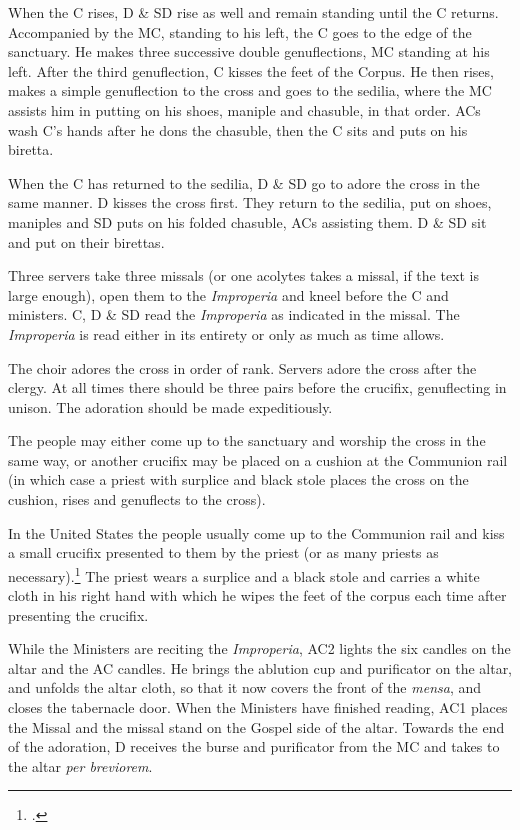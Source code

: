 {    \rubric When the C rises, D \& SD rise as well and remain standing until
    the C returns. Accompanied by the MC, standing to his left, the C goes to
    the edge of the sanctuary. He makes three successive double genuflections,
    MC standing at his left. After the third genuflection, C kisses the feet of
    the Corpus. He then rises, makes a simple genuflection to the cross and
    goes to the sedilia, where the MC assists him in putting on his shoes,
    maniple and chasuble, in that order. ACs wash C's hands after he dons the
    chasuble, then the C sits and puts on his biretta.

    \rubric When the C has returned to the sedilia, D \& SD go to adore the
    cross in the same manner. D kisses the cross first. They return to the
    sedilia, put on shoes, maniples and SD puts on his folded chasuble, ACs
    assisting them. D \& SD sit and put on their birettas.

    \rubric Three servers take three missals (or one acolytes takes a missal,
    if the text is large enough), open them to the \textit{Improperia} and
    kneel before the C and ministers. C, D \& SD read the \textit{Improperia}
    as indicated in the missal. The \textit{Improperia} is read either in its
    entirety or only as much as time allows.

    \rubric The choir adores the cross in order of rank. Servers adore the
    cross after the clergy. At all times there should be three pairs before the
    crucifix, genuflecting in unison. The adoration should be made
    expeditiously.

    \rubric The people may either come up to the sanctuary and worship the
    cross in the same way, or another crucifix may be placed on a cushion at
    the Communion rail (in which case a priest with surplice and black stole
    places the cross on the cushion, rises and genuflects to the cross).

    \rubric In the United States the people usually come up to the Communion
    rail and kiss a small crucifix presented to them by the priest (or as many
    priests as necessary).\footcite[][]{hweekls} The priest wears a surplice
    and a black stole and carries a white cloth in his right hand with which he
    wipes the feet of the corpus each time after presenting the crucifix.

    \rubric While the Ministers are reciting the \textit{Improperia}, AC2
    lights the six candles on the altar and the AC candles. He brings the
    ablution cup and purificator on the altar, and unfolds the altar cloth, so
    that it now covers the front of the \textit{mensa}, and closes the
    tabernacle door. When the Ministers have finished reading, AC1 places the
    Missal and the missal stand on the Gospel side of the altar. Towards the
    end of the adoration, D receives the burse and purificator from the MC and
    takes to the altar \textit{per breviorem}.

}
